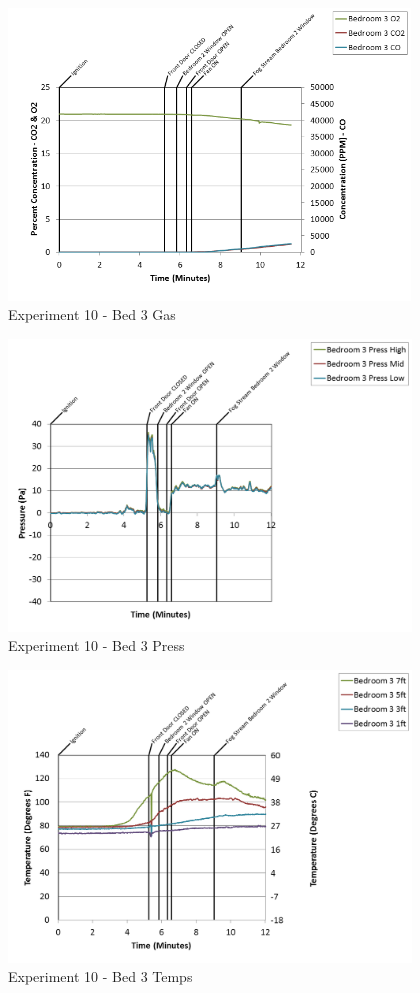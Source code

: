 \documentclass{article}
\begin{document}
\begin{appendices}
\clearpage

\begin{figure}[h!]
	\centering
	\includegraphics[height=3.05in]{0_Images/Results_Charts/Exp_10_Charts/Bed3Gas.png}
	\caption{Experiment 10 - Bed 3 Gas}
\end{figure}


\begin{figure}[h!]
	\centering
	\includegraphics[height=3.05in]{0_Images/Results_Charts/Exp_10_Charts/Bed3Press.png}
	\caption{Experiment 10 - Bed 3 Press}
\end{figure}

\clearpage

\begin{figure}[h!]
	\centering
	\includegraphics[height=3.05in]{0_Images/Results_Charts/Exp_10_Charts/Bed3Temps.png}
	\caption{Experiment 10 - Bed 3 Temps}
\end{figure}



\end{appendices}
\end{document}

